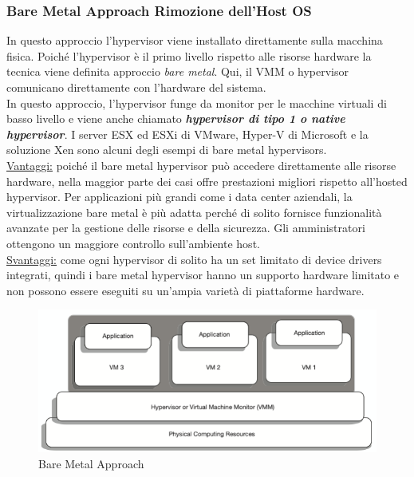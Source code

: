 \documentclass{article}
\begin{document}
\subsubsection{Bare Metal Approach Rimozione dell'Host OS}
In questo approccio l'hypervisor viene installato direttamente sulla macchina fisica. Poiché l'hypervisor è il primo livello rispetto alle risorse hardware la tecnica viene definita approccio \textit{bare metal}. Qui, il VMM o hypervisor comunicano direttamente con l'hardware del sistema. \\
In questo approccio, l'hypervisor funge da monitor per le macchine virtuali di basso livello e viene anche chiamato \textit{\textbf{hypervisor di tipo 1 o native hypervisor}}. I server ESX ed ESXi di VMware, Hyper-V di Microsoft e la soluzione Xen sono alcuni degli esempi di bare metal hypervisors. \\ 
\uline{Vantaggi:} poiché il bare metal hypervisor può accedere direttamente alle risorse hardware, nella maggior parte dei casi offre prestazioni migliori rispetto all'hosted hypervisor. Per applicazioni più grandi come i data center aziendali, la virtualizzazione bare metal è più adatta perché di solito fornisce funzionalità avanzate per la gestione delle risorse e della sicurezza. Gli amministratori ottengono un maggiore controllo sull'ambiente host. \\
\uline{Svantaggi:} come ogni hypervisor di solito ha un set limitato di device drivers integrati, quindi i bare metal hypervisor hanno un supporto hardware limitato e non possono essere eseguiti su un'ampia varietà di piattaforme hardware.
\begin{figure}[H]
    \centering
    \includegraphics[scale=0.8]{img/bare metal.png}
    \caption{Bare Metal Approach}
\end{figure}\noindent
\end{document}
